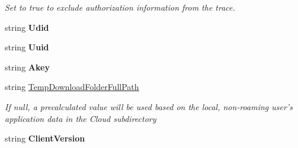 \begin{DoxyCompactItemize}
\begin{DoxyCompactList}\small\item\em Set to true to exclude authorization information from the trace. \end{DoxyCompactList}\item 
\hypertarget{class_cloud_api_public_1_1_file_monitor_1_1_sync_settings_1_1_sync_settings_a036b857eeecf50e0e2b9a9dea0e64464}{string {\bfseries Udid}}\label{class_cloud_api_public_1_1_file_monitor_1_1_sync_settings_1_1_sync_settings_a036b857eeecf50e0e2b9a9dea0e64464}

\item 
\hypertarget{class_cloud_api_public_1_1_file_monitor_1_1_sync_settings_1_1_sync_settings_ae8a2be663c2e1d7d0e4e56e374a054f3}{string {\bfseries Uuid}}\label{class_cloud_api_public_1_1_file_monitor_1_1_sync_settings_1_1_sync_settings_ae8a2be663c2e1d7d0e4e56e374a054f3}

\item 
\hypertarget{class_cloud_api_public_1_1_file_monitor_1_1_sync_settings_1_1_sync_settings_ab3f2f17dc7fda78076c3f54ca84403e0}{string {\bfseries Akey}}\label{class_cloud_api_public_1_1_file_monitor_1_1_sync_settings_1_1_sync_settings_ab3f2f17dc7fda78076c3f54ca84403e0}

\item 
string \hyperlink{class_cloud_api_public_1_1_file_monitor_1_1_sync_settings_1_1_sync_settings_a0234a8261d2a35a6f77de6cbd4e80d85}{Temp\-Download\-Folder\-Full\-Path}
\begin{DoxyCompactList}\small\item\em If null, a precalculated value will be used based on the local, non-\/roaming user's application data in the Cloud subdirectory \end{DoxyCompactList}\item 
\hypertarget{class_cloud_api_public_1_1_file_monitor_1_1_sync_settings_1_1_sync_settings_a803019e12994713654bacc26282f8dc6}{string {\bfseries Client\-Version}}\label{class_cloud_api_public_1_1_file_monitor_1_1_sync_settings_1_1_sync_settings_a803019e12994713654bacc26282f8dc6}


\end{DoxyCompactItemize}

